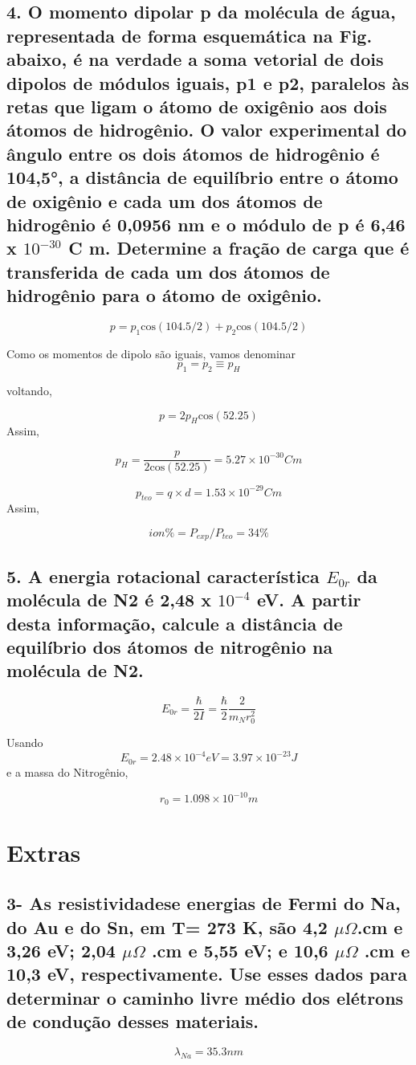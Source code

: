 \documentclass{article}
\begin{document}
\subsection{4. O momento dipolar p da molécula de água, representada de forma esquemática na Fig.  abaixo, é na verdade a soma vetorial de dois dipolos de módulos iguais, p1 e p2,  paralelos às retas que ligam o átomo de oxigênio aos dois átomos de hidrogênio. O  valor experimental do ângulo entre os dois átomos de hidrogênio é 104,5°, a distância  de equilíbrio entre o átomo de oxigênio e cada um dos átomos de hidrogênio é  0,0956 nm e o módulo de p é 6,46 x $10^{-30}$ C m. Determine a fração de carga que é  transferida de cada um dos átomos de hidrogênio para o átomo de oxigênio.} %

\[p = p_1 \text{cos}(104.5/2) +p_2 \text{cos}(104.5/2)\]
    
Como os momentos de dipolo são iguais, vamos denominar
\[p_1=p_2 \equiv p_H\]

voltando,

\[p = 2p_H \text{cos}(52.25)\]
Assim,

\[p_H = \frac{p}{2\text{cos}(52.25)} = 5.27 \times 10^{-30} C m\]

\[p_{teo}  = q \times d = 1.53 \times 10^{-29} C m\]
Assim,

\[ion \% = P_{exp}/P_{teo} = 34\%\]

\subsection{5. A energia rotacional característica $E_{0 r}$ da molécula de N2 é 2,48 x $10^{-4}$ eV. A partir desta  informação, calcule a distância de equilíbrio dos átomos de nitrogênio na molécula de  N2.}  %

\[E_{0 r} = \frac{\hbar}{2I}= \frac{\hbar}{2}\frac{2}{m_N r_0 ^2}\]

Usando \[E_{0 r} = 2.48 \times 10^{-4} eV= 3.97 \times 10^{-23} J\] e a massa do Nitrogênio,


\[r_0 = 1.098 \times 10^{-10}m\]
\pagebreak
\section{Extras}
\subsection{3- As resistividadese energias de Fermi do Na, do Au e do Sn, em T= 273 K, são 4,2 $\mu \Omega$.cm e 3,26 eV; 2,04 $\mu \Omega$ .cm e 5,55 eV; e 10,6 $\mu \Omega$ .cm e 10,3 eV, respectivamente. Use esses dados para determinar o caminho livre médio dos elétrons de condução desses materiais.}
\[ \lambda_{Na} = 35.3 nm \]
\end{document}
